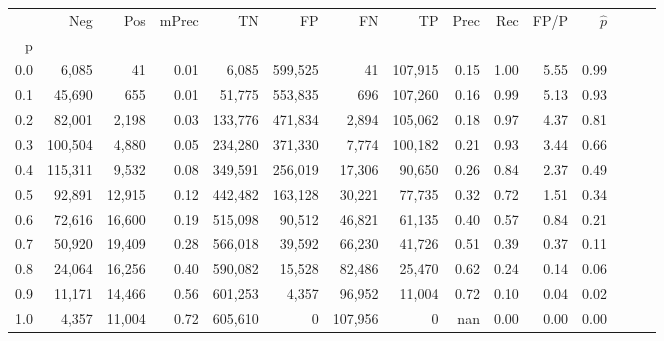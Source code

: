 \begin{tabular}{rrrrrrrrrrrrrrr}
\toprule
{} &      Neg &     Pos & mPrec &       TN &       FP &       FN &       TP &  Prec &   Rec &  FP/P & $\hat{p}$ \\
p   &          &         &       &          &          &          &          &       &       &       &           \\
\midrule
0.0 &    6,085 &      41 &  0.01 &    6,085 &  599,525 &       41 &  107,915 &  0.15 &  1.00 &  5.55 &      0.99 \\
0.1 &   45,690 &     655 &  0.01 &   51,775 &  553,835 &      696 &  107,260 &  0.16 &  0.99 &  5.13 &      0.93 \\
0.2 &   82,001 &   2,198 &  0.03 &  133,776 &  471,834 &    2,894 &  105,062 &  0.18 &  0.97 &  4.37 &      0.81 \\
0.3 &  100,504 &   4,880 &  0.05 &  234,280 &  371,330 &    7,774 &  100,182 &  0.21 &  0.93 &  3.44 &      0.66 \\
0.4 &  115,311 &   9,532 &  0.08 &  349,591 &  256,019 &   17,306 &   90,650 &  0.26 &  0.84 &  2.37 &      0.49 \\
0.5 &   92,891 &  12,915 &  0.12 &  442,482 &  163,128 &   30,221 &   77,735 &  0.32 &  0.72 &  1.51 &      0.34 \\
0.6 &   72,616 &  16,600 &  0.19 &  515,098 &   90,512 &   46,821 &   61,135 &  0.40 &  0.57 &  0.84 &      0.21 \\
0.7 &   50,920 &  19,409 &  0.28 &  566,018 &   39,592 &   66,230 &   41,726 &  0.51 &  0.39 &  0.37 &      0.11 \\
0.8 &   24,064 &  16,256 &  0.40 &  590,082 &   15,528 &   82,486 &   25,470 &  0.62 &  0.24 &  0.14 &      0.06 \\
0.9 &   11,171 &  14,466 &  0.56 &  601,253 &    4,357 &   96,952 &   11,004 &  0.72 &  0.10 &  0.04 &      0.02 \\
1.0 &    4,357 &  11,004 &  0.72 &  605,610 &        0 &  107,956 &        0 &   nan &  0.00 &  0.00 &      0.00 \\
\bottomrule
\end{tabular}

